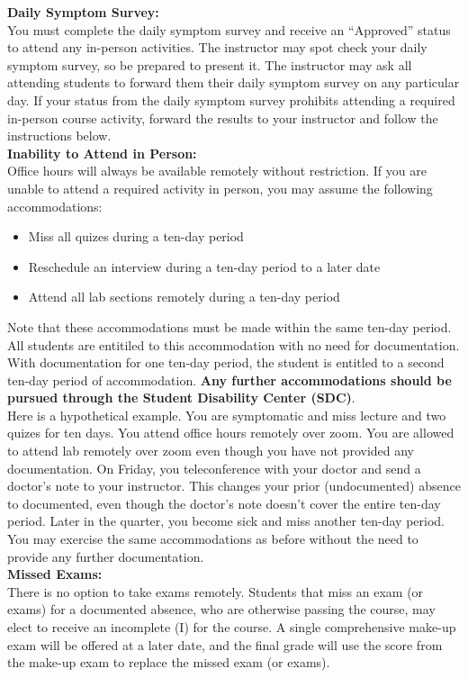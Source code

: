 \documentclass[12pt]{article}
\begin{document}
\noindent \textbf{Daily Symptom Survey:}\\ 
You must complete the daily symptom survey and receive an ``Approved''
status to attend any in-person activities.  The instructor may spot
check your daily symptom survey, so be prepared to present it.  The
instructor may ask all attending students to forward them their daily
symptom survey on any particular day.  If your status from the daily
symptom survey prohibits attending a required in-person course activity,
forward the results to your instructor and follow the instructions
below.\\

\noindent \textbf{Inability to Attend in Person:}\\ 
Office hours will always be available remotely without restriction.
If you are unable to attend a required activity in person, you may assume the following
accommodations:
\begin{itemize}
\item Miss all quizes during a ten-day period
\item Reschedule an interview during a ten-day period to a later date
\item Attend all lab sections remotely during a ten-day period
\end{itemize}
Note that these accommodations must be made within the same ten-day
period.  All students are entitiled to this accommodation with no need
for documentation.  With documentation for one ten-day period, the
student is entitled to a second ten-day period of accommodation.  {\bf
Any further accommodations should be pursued through the Student
Disability Center (SDC)}.\\

\noindent Here is a hypothetical example.  You are symptomatic and
miss lecture and two quizes for ten days.  You attend office hours
remotely over zoom.  You are allowed to attend lab remotely over zoom
even though you have not provided any documentation.  On Friday, you
teleconference with your doctor and send a doctor's note to your
instructor.  This changes your prior (undocumented) absence to
documented, even though the doctor's note doesn't cover the entire
ten-day period.  Later in the quarter, you become sick and miss
another ten-day period.  You may exercise the same accommodations as
before without the need to provide any further documentation.\\

\noindent \textbf{Missed Exams:}\\
There is no option to take exams remotely.  Students that miss an exam
(or exams) for a documented absence, who are otherwise passing the
course, may elect to receive an incomplete (I) for the course.  A
single comprehensive make-up exam will be offered at a later date, and
the final grade will use the score from the make-up exam to replace
the missed exam (or exams).
\end{document}

